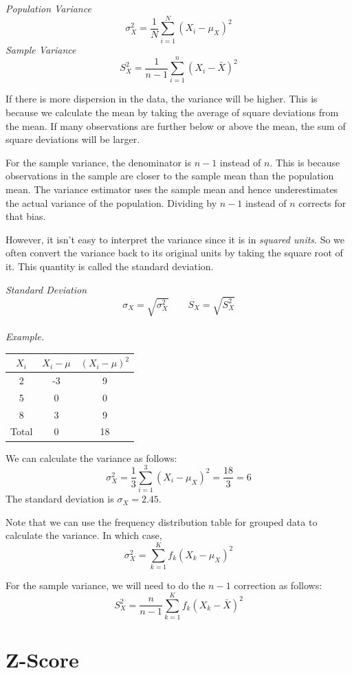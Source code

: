 \documentclass{./../../Latex/handout}
\begin{document}
\textit{Population Variance}
$$ \sigma_X^2 = \frac{1}{N} \sum_{i=1}^N (X_i-\mu_X)^2 $$
\textit{Sample Variance}
$$ S_X^2 = \frac{1}{n-1} \sum_{i=1}^n (X_i-\bar{X})^2 $$

If there is more dispersion in the data, the variance will be higher. This is because we calculate the mean by taking the average of square deviations from the mean. If many observations are further below or above the mean, the sum of square deviations will be larger. 

For the sample variance, the denominator is $n-1$ instead of $n$. This is because observations in the sample are closer to the sample mean than the population mean. The variance estimator uses the sample mean and hence underestimates the actual variance of the population. Dividing by $n-1$ instead of $n$ corrects for that bias. 

However, it isn't easy to interpret the variance since it is in \textit{squared units}. So we often convert the variance back to its original units by taking the square root of it. This quantity is called the standard deviation. 


\textit{Standard Deviation}
$$ \sigma_X = \sqrt{\sigma_X^2} \quad \quad S_X = \sqrt{S_X^2} $$ \\

\textit{Example.}
\begin{center}
	\begin{tabular}{|c|c|c|}
  \hline
  $X_i$ & $X_i-\mu$ & $(X_i-\mu)^2$ \\
  \hline
  2 & -3 & 9 \\
  \hline
  5 & 0 & 0 \\
  \hline
  8 & 3 & 9 \\
  \hline
  Total & 0 & 18 \\
  \hline
  \end{tabular}
\end{center}

We can calculate the variance as follows: 
$$ \sigma_X^2 = \frac{1}{3} \sum_{i=1}^3 (X_i-\mu_X)^2 = \frac{18}{3} = 6$$
The standard deviation is $\sigma_X = 2.45$. 

Note that we can use the frequency distribution table for grouped data to calculate the variance. In which case, 
$$ \sigma_X^2 = \sum_{k=1}^K f_k (X_k-\mu_X)^2 $$

 For the sample variance, we will need to do the $n-1$ correction as follows:
 $$ S_X^2 = \frac{n}{n-1} \sum_{k=1}^K f_k (X_k-\bar{X})^2 $$


\section{Z-Score}
\end{document}
